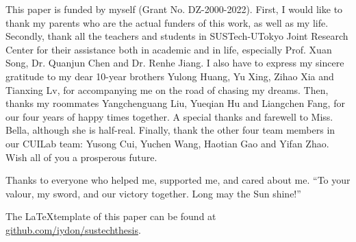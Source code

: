 
This paper is funded by myself (Grant No. DZ-2000-2022). First, I would like to thank my parents who are the actual funders of this work, as well as my life. Secondly, thank all the teachers and students in SUSTech-UTokyo Joint Research Center for their assistance both in academic and in life, especially Prof. Xuan Song, Dr. Quanjun Chen and Dr. Renhe Jiang. I also have to express my sincere gratitude to my dear 10-year brothers Yulong Huang, Yu Xing, Zihao Xia and Tianxing Lv, for accompanying me on the road of chasing my dreams. Then, thanks my roommates Yangchenguang Liu, Yueqian Hu and Liangchen Fang, for our four years of happy times together. A special thanks and farewell to Miss. Bella, although she is half-real. Finally, thank the other four team members in our CUILab team: Yusong Cui, Yuchen Wang, Haotian Gao and Yifan Zhao. Wish all of you a prosperous future.

Thanks to everyone who helped me, supported me, and cared about me. ``To your valour, my sword, and our victory together. Long may the Sun shine!''

\vspace{\baselineskip}

The \LaTeX template of this paper can be found at \href{https://github.com/iydon/sustechthesis}{github.com/iydon/sustechthesis}.